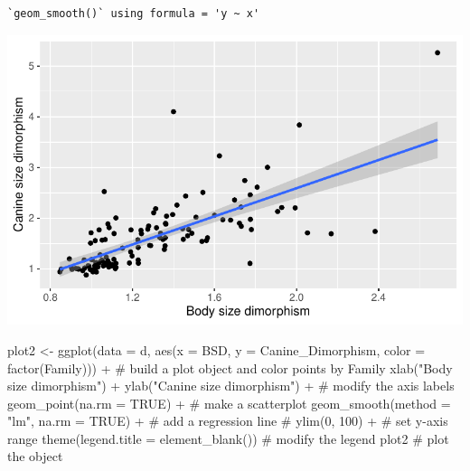 \documentclass[
  letterpaper,
  DIV=11,
  numbers=noendperiod]{scrartcl}
\newenvironment{Shaded}{\begin{snugshade}}{\end{snugshade}}
\newcommand{\AttributeTok}[1]{\textcolor[rgb]{0.40,0.45,0.13}{#1}}
\newcommand{\CommentTok}[1]{\textcolor[rgb]{0.37,0.37,0.37}{#1}}
\newcommand{\ConstantTok}[1]{\textcolor[rgb]{0.56,0.35,0.01}{#1}}
\newcommand{\FunctionTok}[1]{\textcolor[rgb]{0.28,0.35,0.67}{#1}}
\newcommand{\NormalTok}[1]{\textcolor[rgb]{0.00,0.23,0.31}{#1}}
\newcommand{\OtherTok}[1]{\textcolor[rgb]{0.00,0.23,0.31}{#1}}
\newcommand{\SpecialCharTok}[1]{\textcolor[rgb]{0.37,0.37,0.37}{#1}}
\newcommand{\StringTok}[1]{\textcolor[rgb]{0.13,0.47,0.30}{#1}}
\begin{document}
\begin{verbatim}
`geom_smooth()` using formula = 'y ~ x'
\end{verbatim}

\includegraphics{EDA-challenge_files/figure-pdf/unnamed-chunk-5-1.pdf}

\begin{Shaded}
\begin{Highlighting}[]
\NormalTok{plot2 }\OtherTok{\textless{}{-}} \FunctionTok{ggplot}\NormalTok{(}\AttributeTok{data =}\NormalTok{ d, }
            \FunctionTok{aes}\NormalTok{(}\AttributeTok{x =}\NormalTok{ BSD, }
                \AttributeTok{y =}\NormalTok{ Canine\_Dimorphism,}
                \AttributeTok{color =} \FunctionTok{factor}\NormalTok{(Family))) }\SpecialCharTok{+}  \CommentTok{\# build a plot object and color points by Family}
  \FunctionTok{xlab}\NormalTok{(}\StringTok{"Body size dimorphism"}\NormalTok{) }\SpecialCharTok{+} \FunctionTok{ylab}\NormalTok{(}\StringTok{"Canine size dimorphism"}\NormalTok{) }\SpecialCharTok{+} \CommentTok{\# modify the axis labels}
  \FunctionTok{geom\_point}\NormalTok{(}\AttributeTok{na.rm =} \ConstantTok{TRUE}\NormalTok{) }\SpecialCharTok{+} \CommentTok{\# make a scatterplot}
  \FunctionTok{geom\_smooth}\NormalTok{(}\AttributeTok{method =} \StringTok{"lm"}\NormalTok{, }\AttributeTok{na.rm =} \ConstantTok{TRUE}\NormalTok{) }\SpecialCharTok{+} \CommentTok{\# add a regression line}
  \CommentTok{\# ylim(0, 100) + \# set y{-}axis range}
  \FunctionTok{theme}\NormalTok{(}\AttributeTok{legend.title =} \FunctionTok{element\_blank}\NormalTok{()) }\CommentTok{\# modify the legend}
\NormalTok{plot2 }\CommentTok{\# plot the object}
\end{Highlighting}
\end{Shaded}
\end{document}
